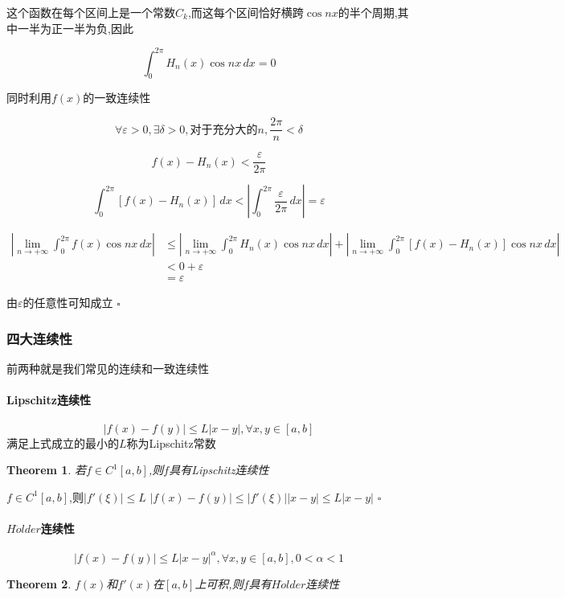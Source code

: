 \documentclass[11pt,hyperref,a4paper,UTF8]{ctexart}
\newtheorem{theorem}{Theorem}[subsection]
\newenvironment{cproof}{%
\heiti{证明}\kaishu
}{%
  \hfill $\square$
  \par\bigskip
}
\newcommand{\bracket}[1]{\left[#1\right]}
\newcommand{\abs}[1]{\left|#1\right|}
\begin{document}
\begin{CJK}{UTF8}{gkai}
\begin{cproof}
这个函数在每个区间上是一个常数$C_k$,而这每个区间恰好横跨$\cos nx$的半个周期,其中一半为正一半为负,因此

\[\int_{0}^{2 \pi} H_n(x) \cos nx \, dx = 0\]

同时利用$f(x)$的一致连续性

\[\forall \varepsilon> 0 ,\exists \delta > 0,\text{对于充分大的}n,\dfrac{2\pi}{n} < \delta\]

\[f(x) - H_n(x) < \dfrac{\varepsilon}{2 \pi}\]

\[\int_{0}^{2 \pi}\bracket{f(x) - H_n(x)}\, dx < |\int_{0}^{2 \pi}\dfrac{\varepsilon}{2 \pi}\,dx| = \varepsilon\]

\[
\begin{aligned}
  \abs{\lim_{n \to +\infty} \int_{0}^{2 \pi} f(x)\cos nx \, dx} &\leq \abs{\lim_{n \to +\infty} \int_{0}^{2 \pi} H_n(x)\cos nx \, dx} + \abs{\lim_{n \to +\infty} \int_{0}^{2 \pi} \bracket{f(x) - H_n(x)}\cos nx \, dx}\\
  &< 0 + \varepsilon\\
  &= \varepsilon
\end{aligned}  
\]

由$\varepsilon$的任意性可知成立
\end{cproof}


\subsubsection{四大连续性}
前两种就是我们常见的连续和一致连续性

\paragraph{Lipschitz连续性}
\[\abs{f(x) - f(y)} \leq L|x - y|,\forall x,y \in [a,b]\]
满足上式成立的最小的$L$称为Lipschitz常数
\begin{theorem}
  若$f\in C^1[a,b]$,则$f$具有Lipschitz连续性
\end{theorem}
\begin{cproof}
$f\in C^1[a,b]$,则$ \abs{f'(\xi)} \leq L$
$\abs{f(x) - f(y)} \leq \abs{f'(\xi)}|x - y|\leq L|x - y|$
\end{cproof}
\paragraph{$H\ddot{o}lder$连续性}

\[\abs{f(x) - f(y)} \leq L|x - y|^{\alpha},\forall x,y \in [a,b],0 < \alpha < 1\]


\begin{theorem}
  $f(x)$和$f'(x)$在$[a,b]$上可积,则$f$具有$H\ddot{o}lder$连续性
\end{theorem}


\end{CJK}
\end{document}
